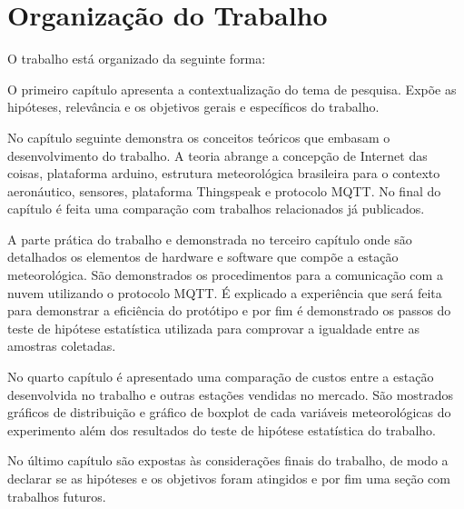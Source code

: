 \section{Organização do Trabalho}

O trabalho está organizado da seguinte forma:

O primeiro capítulo apresenta a contextualização do tema de pesquisa. 
Expõe as hipóteses, relevância e os objetivos gerais e específicos do trabalho.

No capítulo seguinte demonstra os conceitos teóricos que embasam o desenvolvimento do trabalho. A teoria abrange a concepção de Internet das coisas, plataforma arduino, estrutura meteorológica brasileira para o contexto aeronáutico, sensores, plataforma Thingspeak e protocolo MQTT. No final do capítulo é feita uma comparação com trabalhos relacionados já publicados.

A parte prática do trabalho e demonstrada no terceiro capítulo onde são detalhados os elementos de hardware e software que compõe a estação meteorológica. São demonstrados os procedimentos para a comunicação com a nuvem utilizando o protocolo MQTT. É explicado a experiência que será feita para demonstrar a eficiência do protótipo e por fim é demonstrado os passos do teste de hipótese estatística utilizada para comprovar a igualdade entre as amostras coletadas.

No quarto capítulo é apresentado uma comparação de custos entre a estação desenvolvida no trabalho e outras estações vendidas no mercado. São mostrados gráficos de distribuição e gráfico de boxplot de cada variáveis meteorológicas do experimento além dos resultados do teste de hipótese estatística do trabalho.

No último capítulo são expostas às considerações finais do trabalho, de modo a declarar se as hipóteses e os objetivos foram atingidos e por fim uma seção com trabalhos futuros.








 









